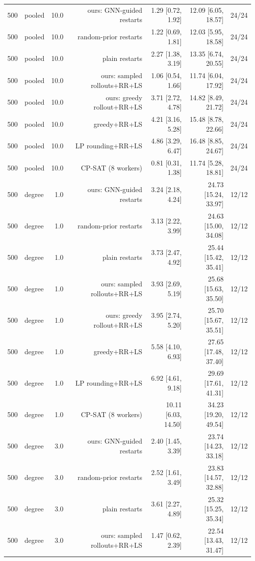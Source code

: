 \begin{table}[t]
\begin{tabular}{llrrrrr}
500 & pooled & 10.0 & ours: GNN-guided restarts & 1.29 [0.72, 1.92] & 12.09 [6.05, 18.57] & 24/24 \\
500 & pooled & 10.0 & random-prior restarts & 1.22 [0.69, 1.81] & 12.03 [5.95, 18.58] & 24/24 \\
500 & pooled & 10.0 & plain restarts & 2.27 [1.38, 3.19] & 13.35 [6.74, 20.55] & 24/24 \\
500 & pooled & 10.0 & ours: sampled rollouts+RR+LS & 1.06 [0.54, 1.66] & 11.74 [6.04, 17.92] & 24/24 \\
500 & pooled & 10.0 & ours: greedy rollout+RR+LS & 3.71 [2.72, 4.78] & 14.82 [8.49, 21.72] & 24/24 \\
500 & pooled & 10.0 & greedy+RR+LS & 4.21 [3.16, 5.28] & 15.48 [8.78, 22.66] & 24/24 \\
500 & pooled & 10.0 & LP rounding+RR+LS & 4.86 [3.29, 6.47] & 16.48 [8.85, 24.67] & 24/24 \\
500 & pooled & 10.0 & CP-SAT (8 workers) & 0.81 [0.31, 1.38] & 11.74 [5.28, 18.81] & 24/24 \\
500 & degree & 1.0 & ours: GNN-guided restarts & 3.24 [2.18, 4.24] & 24.73 [15.24, 33.97] & 12/12 \\
500 & degree & 1.0 & random-prior restarts & 3.13 [2.22, 3.99] & 24.63 [15.00, 34.08] & 12/12 \\
500 & degree & 1.0 & plain restarts & 3.73 [2.47, 4.92] & 25.44 [15.42, 35.41] & 12/12 \\
500 & degree & 1.0 & ours: sampled rollouts+RR+LS & 3.93 [2.69, 5.19] & 25.68 [15.63, 35.50] & 12/12 \\
500 & degree & 1.0 & ours: greedy rollout+RR+LS & 3.95 [2.74, 5.20] & 25.70 [15.67, 35.51] & 12/12 \\
500 & degree & 1.0 & greedy+RR+LS & 5.58 [4.10, 6.93] & 27.65 [17.48, 37.40] & 12/12 \\
500 & degree & 1.0 & LP rounding+RR+LS & 6.92 [4.61, 9.18] & 29.69 [17.61, 41.31] & 12/12 \\
500 & degree & 1.0 & CP-SAT (8 workers) & 10.11 [6.03, 14.50] & 34.23 [19.20, 49.54] & 12/12 \\
500 & degree & 3.0 & ours: GNN-guided restarts & 2.40 [1.45, 3.39] & 23.74 [14.23, 33.18] & 12/12 \\
500 & degree & 3.0 & random-prior restarts & 2.52 [1.61, 3.49] & 23.83 [14.57, 32.88] & 12/12 \\
500 & degree & 3.0 & plain restarts & 3.61 [2.27, 4.89] & 25.32 [15.25, 35.34] & 12/12 \\
500 & degree & 3.0 & ours: sampled rollouts+RR+LS & 1.47 [0.62, 2.39] & 22.54 [13.43, 31.47] & 12/12 \\

\end{tabular}
\end{table}
